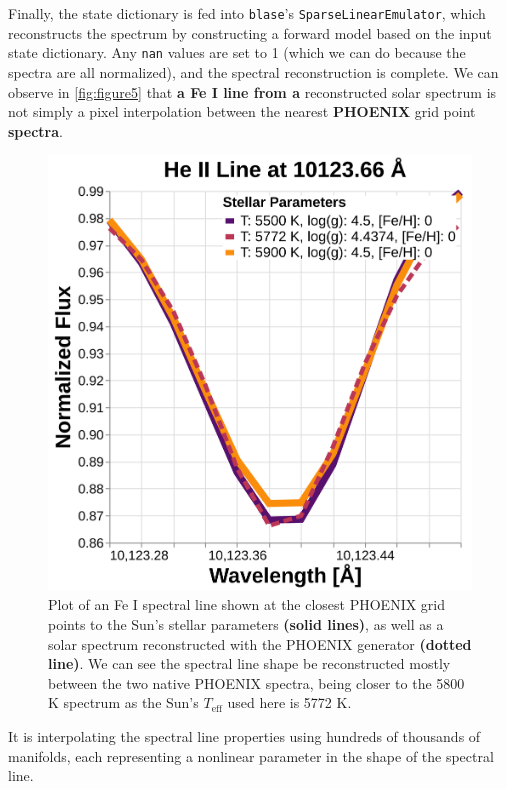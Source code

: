 \documentclass[twocolumn, linenumbers]{aastex631}
\begin{document}
Finally, the state dictionary is fed into \texttt{blase}'s \texttt{SparseLinearEmulator}, which reconstructs the spectrum by constructing a forward model based on the input state dictionary.
Any \texttt{nan} values are set to 1 (which we can do because the spectra are all normalized), and the spectral reconstruction is complete.
We can observe in \autoref{fig:figure5} that \textbf{a Fe I line from a} reconstructed solar spectrum is not simply a pixel interpolation between the nearest \textbf{PHOENIX} grid point \textbf{spectra}.
\begin{figure}
    \centering
    \includegraphics[width=\textwidth]{figure5}
    \caption{Plot of an Fe I spectral line shown at the closest PHOENIX grid points to the Sun's stellar parameters \textbf{(solid lines)}, as well as a solar spectrum reconstructed with the PHOENIX generator \textbf{(dotted line)}.
    We can see the spectral line shape be reconstructed mostly between the two native PHOENIX spectra, being closer to the 5800 K spectrum as the Sun's $T_{\mathrm{eff}}$ used here is 5772 K.}
    \label{fig:figure5}
\end{figure}
It is interpolating the spectral line properties using hundreds of thousands of manifolds, each representing a nonlinear parameter in the shape of the spectral line.
\end{document}
